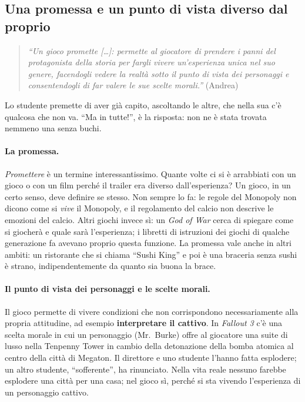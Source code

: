 \subsection{Una promessa e un punto di vista diverso dal proprio}

\begin{quote}
\emph{``Un gioco promette [\dots]: permette al giocatore di prendere i panni del
protagonista della storia per fargli vivere un'esperienza unica nel suo
genere, facendogli vedere la realtà sotto il punto di vista dei personaggi e
consentendogli di far valere le sue scelte morali.''} (Andrea)
\end{quote}

Lo studente premette di aver già capito, ascoltando le altre, che nella sua
c'è qualcosa che non va. ``Ma in tutte!'', è la risposta: non ne è stata
trovata nemmeno una senza buchi.

\paragraph{La promessa.} \emph{Promettere} è un termine interessantissimo.
Quante volte ci si è arrabbiati con un gioco o con un film perché il trailer
era diverso dall'esperienza? Un gioco, in un certo senso, deve definire se
stesso. Non sempre lo fa: le regole del Monopoly non dicono come si
\emph{vive} il Monopoly, e il regolamento del calcio non descrive le emozioni
del calcio. Altri giochi invece sì: un \emph{God of War} cerca di spiegare
come si giocherà e quale sarà l'esperienza; i libretti di istruzioni dei
giochi di qualche generazione fa avevano proprio questa funzione. La promessa
vale anche in altri ambiti: un ristorante che si chiama ``Sushi King'' e poi è
una braceria senza sushi è strano, indipendentemente da quanto sia buona la
brace.

\paragraph{Il punto di vista dei personaggi e le scelte morali.} Il gioco
permette di vivere condizioni che non corrispondono necessariamente alla
propria attitudine, ad esempio \textbf{interpretare il cattivo}. In
\emph{Fallout 3} c'è una scelta morale in cui un personaggio (Mr.\ Burke)
offre al giocatore una suite di lusso nella Tenpenny Tower in cambio della
detonazione della bomba atomica al centro della città di Megaton. Il
direttore e uno studente l'hanno fatta esplodere; un altro studente,
``sofferente'', ha rinunciato. Nella vita reale nessuno farebbe esplodere una
città per una casa; nel gioco sì, perché si sta vivendo l'esperienza di un
personaggio cattivo.

